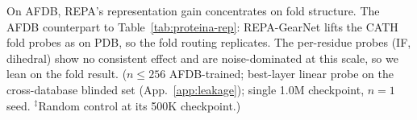 \begin{table}[tbp]
\centering
\small
\setlength{\tabcolsep}{6pt}

\caption{On AFDB, REPA's representation gain concentrates on fold structure. The AFDB counterpart to Table~\ref{tab:proteina-rep}: REPA-GearNet lifts the CATH fold probes as on PDB, so the fold routing replicates. The per-residue probes (IF, dihedral) show no consistent effect and are noise-dominated at this scale, so we lean on the fold result. ($n{\le}256$ AFDB-trained; best-layer linear probe on the cross-database blinded set (App.~\ref{app:leakage}); single 1.0M checkpoint, $n{=}1$ seed. $^{\ddagger}$Random control at its 500K checkpoint.)}
\label{tab:proteina-rep-afdb}
\end{table}
